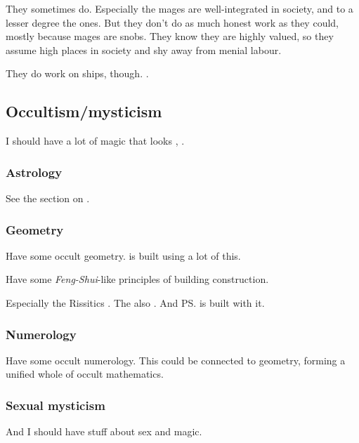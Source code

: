 They sometimes do. 
Especially the  mages are well-integrated in society, and to a lesser degree the  ones. 
But they don't do as much honest work as they could, mostly because mages are snobs. 
They know they are highly valued, so they assume high places in society and shy away from menial labour. 

They do work on ships, though. 
. 









\subsection{Occultism/mysticism}
I should have a lot of magic that looks , . 





\subsubsection{Astrology}
See the section on .





\subsubsection{Geometry}
Have some occult geometry. 
 is built using a lot of this.

Have some \emph{Feng-Shui}-like principles of building construction. 

Especially the Rissitics . 
The \Ortaicans{} also . 
And \ps{\Ishnaruchaefir}  is built with it. 





\subsubsection{Numerology}
Have some occult numerology. This could be connected to geometry, forming a unified whole of occult mathematics.





\subsubsection{Sexual mysticism}
And I should have stuff about sex and magic. 








